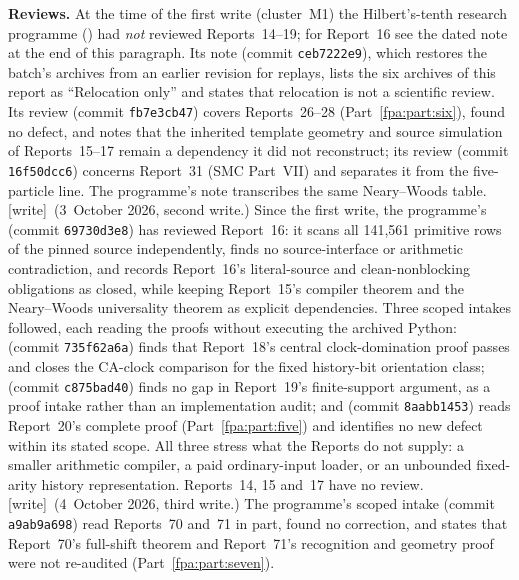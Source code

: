\documentclass[11pt,a4paper]{article}
\numberwithin{equation}{section}
\newcommand{\wtag}{\textup{[write]}}
\begin{document}
\textbf{Reviews.} At the time of the first write (cluster~M1) the Hilbert's-tenth research programme () had \emph{not} reviewed Reports~14--19; for Report~16 see the dated note at the end of this paragraph. Its note  (commit \texttt{ceb7222e9}), which restores the batch's archives from an earlier revision for replays, lists the six archives of this report as ``Relocation only'' and states that relocation is not a scientific review. Its review  (commit \texttt{fb7e3cb47}) covers Reports~26--28 (Part~\ref{fpa:part:six}), found no defect, and notes that the inherited template geometry and source simulation of Reports~15--17 remain a dependency it did not reconstruct; its review  (commit \texttt{16f50dcc6}) concerns Report~31 (SMC Part~VII) and separates it from the five-particle line. The programme's note  transcribes the same Neary--Woods table. \wtag\ (3~October 2026, second write.) Since the first write, the programme's  (commit \texttt{69730d3e8}) has reviewed Report~16: it scans all 141,561 primitive rows of the pinned source independently, finds no source-interface or arithmetic contradiction, and records Report~16's literal-source and clean-nonblocking obligations as closed, while keeping Report~15's compiler theorem and the Neary--Woods universality theorem as explicit dependencies. Three scoped intakes followed, each reading the proofs without executing the archived Python:  (commit \texttt{735f62a6a}) finds that Report~18's central clock-domination proof passes and closes the CA-clock comparison for the fixed history-bit orientation class;  (commit \texttt{c875bad40}) finds no gap in Report~19's finite-support argument, as a proof intake rather than an implementation audit; and  (commit \texttt{8aabb1453}) reads Report~20's complete proof (Part~\ref{fpa:part:five}) and identifies no new defect within its stated scope. All three stress what the Reports do not supply: a smaller arithmetic compiler, a paid ordinary-input loader, or an unbounded fixed-arity history representation. Reports~14, 15 and~17 have no review. \wtag\ (4~October 2026, third write.) The programme's scoped intake  (commit \texttt{a9ab9a698}) read Reports~70 and~71 in part, found no correction, and states that Report~70's full-shift theorem and Report~71's recognition and geometry proof were not re-audited (Part~\ref{fpa:part:seven}).
\end{document}
